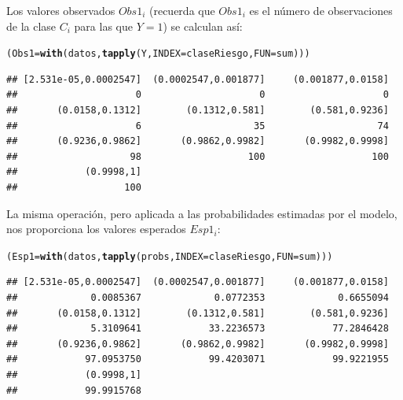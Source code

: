 \documentclass[10pt,a4paper]{article}\usepackage[]{graphicx}\usepackage[]{color}
\makeatletter
\newcommand{\hlstd}[1]{\textcolor[rgb]{0.345,0.345,0.345}{#1}}%
\newcommand{\hlkwb}[1]{\textcolor[rgb]{0.69,0.353,0.396}{#1}}%
\newcommand{\hlkwc}[1]{\textcolor[rgb]{0.333,0.667,0.333}{#1}}%
\newcommand{\hlkwd}[1]{\textcolor[rgb]{0.737,0.353,0.396}{\textbf{#1}}}%
\newenvironment{kframe}{%
 \def\at@end@of@kframe{}%
 \ifinner\ifhmode%
  \def\at@end@of@kframe{\end{minipage}}%
  \begin{minipage}{\columnwidth}%
 \fi\fi%
 \def\FrameCommand##1{\hskip\@totalleftmargin \hskip-\fboxsep
 \colorbox{shadecolor}{##1}\hskip-\fboxsep
     \hskip-\linewidth \hskip-\@totalleftmargin \hskip\columnwidth}%
 \MakeFramed {\advance\hsize-\width
   \@totalleftmargin\z@ \linewidth\hsize
   \@setminipage}}%
 {\par\unskip\endMakeFramed%
 \at@end@of@kframe}
\newenvironment{knitrout}{}{} %
\makeatother
\begin{document}
Los valores observados $Obs1_i$ (recuerda que $Obs1_i$ es el número de observaciones de la clase $C_i$ para las que $Y=1$) se calculan así:
\begin{knitrout}
\color{fgcolor}\begin{kframe}
\begin{alltt}
\hlstd{(Obs1} \hlkwb{=} \hlkwd{with}\hlstd{(datos,} \hlkwd{tapply}\hlstd{(Y,} \hlkwc{INDEX} \hlstd{= claseRiesgo,} \hlkwc{FUN} \hlstd{= sum)) )}
\end{alltt}
\begin{verbatim}
## [2.531e-05,0.0002547]  (0.0002547,0.001877]     (0.001877,0.0158] 
##                     0                     0                     0 
##       (0.0158,0.1312]        (0.1312,0.581]        (0.581,0.9236] 
##                     6                    35                    74 
##       (0.9236,0.9862]       (0.9862,0.9982]       (0.9982,0.9998] 
##                    98                   100                   100 
##            (0.9998,1] 
##                   100
\end{verbatim}
\end{kframe}
\end{knitrout}




La misma operación, pero aplicada a las probabilidades estimadas por el modelo, nos proporciona los valores esperados $Esp1_i$:

\begin{knitrout}
\color{fgcolor}\begin{kframe}
\begin{alltt}
\hlstd{(Esp1} \hlkwb{=} \hlkwd{with}\hlstd{(datos,} \hlkwd{tapply}\hlstd{(probs,} \hlkwc{INDEX} \hlstd{= claseRiesgo,} \hlkwc{FUN} \hlstd{= sum)) )}
\end{alltt}
\begin{verbatim}
## [2.531e-05,0.0002547]  (0.0002547,0.001877]     (0.001877,0.0158] 
##             0.0085367             0.0772353             0.6655094 
##       (0.0158,0.1312]        (0.1312,0.581]        (0.581,0.9236] 
##             5.3109641            33.2236573            77.2846428 
##       (0.9236,0.9862]       (0.9862,0.9982]       (0.9982,0.9998] 
##            97.0953750            99.4203071            99.9221955 
##            (0.9998,1] 
##            99.9915768
\end{verbatim}
\end{kframe}
\end{knitrout}
\end{document}
